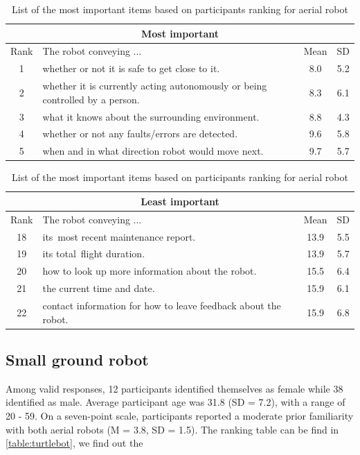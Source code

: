 \documentclass[letterpaper, 10 pt, conference]{ieeeconf}  %
\begin{document}
\begin {table}[h]
\begin{center}
\label{table:bebop}
\begin{tabular}{|c|p{150pt}|c|c|}
 \hline
 \multicolumn{4}{|c|}{Most important} \\
 \hline
 Rank & The robot conveying ... & Mean & SD \\
 \hline
 \rowcolor{Gray}
 1 & whether or not it is safe to get close to it. & 8.0 & 5.2\\
 \hline
 \rowcolor{Gray}
2 & whether it is currently acting autonomously or being controlled by a person. & 8.3 & 6.1\\
 \hline
 \rowcolor{Gray}
3 & what it knows about the surrounding environment. & 8.8 & 4.3\\
 \hline
4 & whether or not any faults/errors are detected. & 9.6 & 5.8\\
 \hline
5 & when and in what direction robot would move next. & 9.7 & 5.7\\
 \hline
\end{tabular}

\vspace*{0.5 cm}

\begin{tabular}{|c|p{150pt}|c|c|}
 \hline
  \multicolumn{4}{|c|}{Least important} \\
 \hline
 Rank & The robot conveying ... & Mean & SD \\
 \hline
18 & its most recent maintenance report. & 13.9 & 5.5 \\
 \hline
19 & its total flight duration. & 13.9 & 5.7 \\
 \hline
 \rowcolor{Gray}
20 & how to look up more information about the robot. & 15.5 & 6.4 \\
 \hline
 \rowcolor{Gray}
21 & the current time and date. & 15.9 & 6.1 \\
 \hline
 \rowcolor{Gray}
22 & contact information for how to leave feedback about the robot. & 15.9 & 6.8 \\
 \hline
 
\end{tabular}
\end{center}

\caption{List of the most important items based on participants ranking for aerial robot}
\end{table}


\subsection{Small ground robot}
Among valid responses, 12 participants identified themselves as female while 38 identified as male. Average participant age was 31.8 (SD = 7.2), with a range of 20 - 59. On a seven-point scale, participants reported a moderate prior familiarity with both aerial robots (M = 3.8, SD = 1.5). The ranking table can be find in \ref{table:turtlebot}, we find out the 
    
\end{document}
